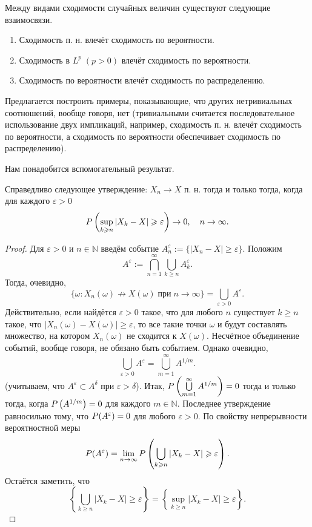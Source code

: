 \begin{theorem}\label{lect09:th3}
Между видами сходимости случайных величин существуют следующие взаимосвязи.
\begin{enumerate}
\item Сходимость п. н. влечёт сходимость по вероятности.
\item Сходимость в $L^p\;(p>0)$ влечёт сходимость по вероятности.
\item Сходимость по вероятности влечёт сходимость по распределению.
\end{enumerate}
\end{theorem}

Предлагается построить примеры, показывающие, что других нетривиальных соотношений, вообще говоря, нет (тривиальными считается последовательное использование двух импликаций, например, сходимость п. н. влечёт сходимость по вероятности, а сходимость по вероятности обеспечивает сходимость по распределению).

Нам понадобится вспомогательный результат.

\begin{lemma}\label{lect09:lemma2}
Справедливо следующее утверждение: $X_n\to X$ п. н. тогда и только тогда, когда для каждого $\varepsilon>0$
\begin{equation}\label{lect09:eq16}
\P\left(\sup_{k\geqslant n}|X_k-X|\geqslant\varepsilon\right)\to 0,\quad n\to\infty.
\end{equation}
\end{lemma}
\begin{proof}
Для $\varepsilon>0$ и $n\in\mathbb{N}$ введём событие $A_n^\varepsilon:=\{|X_n-X|\geqslant\varepsilon\}$. Положим
\[ A^\varepsilon:=\bigcap_{n=1}^\infty\bigcup_{k\geqslant n}A_k^\varepsilon. \]
Тогда, очевидно, 
\[ \{\omega:X_n(\omega)\not\to X(\omega)\;\text{при}\;n\to\infty\}=\bigcup\limits_{\varepsilon>0}A^\varepsilon.\] 
Действительно, если найдётся $\varepsilon>0$ такое, что для любого $n$ существует $k\geqslant n$ такое, что $|X_n(\omega)-X(\omega)|\geqslant\varepsilon$, то все такие точки $\omega$ и будут составлять множество, на котором $X_n(\omega)$ не сходится к $X(\omega)$. Несчётное объединение событий, вообще говоря, не обязано быть событием. Однако очевидно, 
\[ \bigcup_{\varepsilon>0} A^\varepsilon=\bigcup_{m=1}^\infty A^{1/m}. \]
(учитываем, что $A^\varepsilon\subset A^\delta$ при $\varepsilon>\delta$). Итак, $\P\left(\bigcup\limits_{m=1}^\infty A^{1/m}\right)=0$ тогда и только тогда, когда $\P\left(A^{1/m}\right)=0$ для каждого $m\in\mathbb{N}$. Последнее утверждение равносильно тому, что $\P(A^\varepsilon)=0$ для любого $\varepsilon>0$. По свойству непрерывности вероятностной меры
\[ \P(A^\varepsilon)=\lim_{n\to\infty}\P\left(\bigcup_{k\geqslant n}|X_k-X|\geqslant\varepsilon\right). \] 
Остаётся заметить, что 
\[ \left\{\bigcup_{k\geqslant n}|X_k-X|\geqslant\varepsilon\right\}=\left\{\sup_{k\geqslant n}|X_k-X|\geqslant\varepsilon\right\}. \]
\end{proof}

